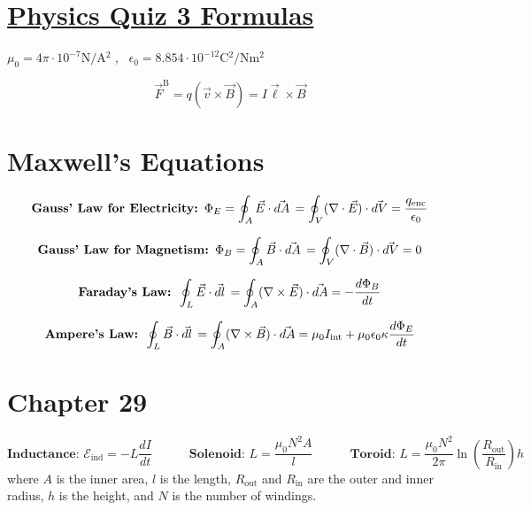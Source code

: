 \documentclass[fleqn,12pt]{article}
\begin{document}
\setlength{\abovedisplayskip}{2pt}
\setlength{\belowdisplayskip}{2pt}
\section*{\LARGE\underline{Physics Quiz 3 Formulas}}
$ \mu_0 = 4\pi \cdot 10^{-7} \si{\newton\per\ampere^2}$ , \, 
$\epsilon_0 = 8.854 \cdot 10^{-12} \si{\coulomb^2\per\newton\meter^2}$

\begin{equation}
  \vec{F}^\mathrm{B} = q(\vec{v} \times \vec{B}) = I\vec{\ell} \times \vec{B}
\end{equation}
\section*{Maxwell's Equations}
\begin{equation} \label{eq1}
 \mbox{\textbf{Gauss' Law for Electricity: }}\Phi_{E} = 
    \oint_A \vec{E} \cdot \vec{dA} \, = \oint_V ( \nabla \cdot \vec{E}) \cdot \vec{dV}
= \frac{q_\mathrm{enc}}{\epsilon_0}
\end{equation}

\begin{equation} \label{eq1}
 \mbox{\textbf{Gauss' Law for Magnetism: }}\Phi_{B} = 
    \oint_A \vec{B} \cdot \vec{dA} \, = \oint_V ( \nabla \cdot \vec{B}) \cdot \vec{dV}
= 0
\end{equation}

\begin{equation} \label{eq1}
 \mbox{\textbf{Faraday's Law: }}
    \oint_L \vec{E} \cdot \vec{dl} \, = \oint_A ( \nabla \times \vec{E}) \cdot \vec{dA}
= - \frac{d\Phi_{B}}{dt}
\end{equation}

\begin{equation} \label{eq1}
 \mbox{\textbf{Ampere's Law: }}
    \oint_L \vec{B} \cdot \vec{dl} \, = \oint_A ( \nabla \times \vec{B}) \cdot \vec{dA}
= \mu_{0}I_\mathrm{int} + \mu_{0}\epsilon_{0}\kappa\frac{d\Phi_{E}}{dt}
\end{equation}

\section*{Chapter 29}

\begin{equation} \label{eq1}
 \textbf{Inductance: }\mathcal{E}_\mathrm{ind} = -L \frac{dI}{dt}
 \quad \quad \quad \textbf{Solenoid: }L = \frac{\mu_0 N^2 A}{l}
 \quad \quad \quad \textbf{Toroid: }L = \frac{\mu_0 N^2}{2\pi}\ln \left( \frac{R_\mathrm{out}}{R_\mathrm{in}} \right)h
\end{equation}
where $A$ is the inner area, $l$ is the length, $R_\mathrm{out}$ and $R_\mathrm{in}$ are the outer and inner radius, $h$ is the height, and $N$ is the number of windings.
\end{document}
